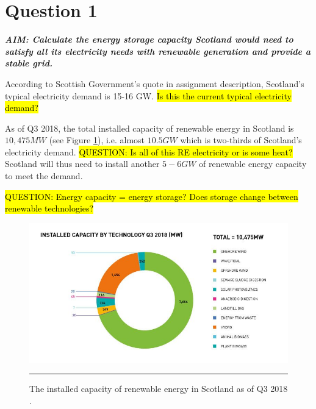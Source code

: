 \section{Question 1}

\textit{\textbf{AIM: Calculate the energy storage capacity Scotland would need to satisfy all its electricity needs with renewable generation and provide a stable grid.}}

According to Scottish Government's quote in assignment description, Scotland's typical electricity demand is 15-16 GW.
\hl{Is this the current typical electricity demand?}

As of Q3 2018, the total installed capacity of renewable energy in Scotland is $10,475 MW$ (see Figure \ref{fig:installed_capacity}), i.e. almost $10.5 GW$ which is two-thirds of Scotland's electricity demand.
\hl{QUESTION: Is all of this RE electricity or is some heat?}
Scotland will thus need to install another $5-6 GW$ of renewable energy capacity to meet the demand.

\hl{QUESTION: Energy capacity = energy storage? Does storage change between renewable technologies?}

\begin{figure}[htbp]
	\centering
	\includegraphics[width=\textwidth]{figures/installed-capacity-by-technology-q3-2018.jpg}
	\rule{\textwidth}{0.5pt} %
	\caption{The installed capacity of renewable energy in Scotland as of Q3 2018 \citep{ScottishRenewables}.}
	\label{fig:installed_capacity}
\end{figure}

